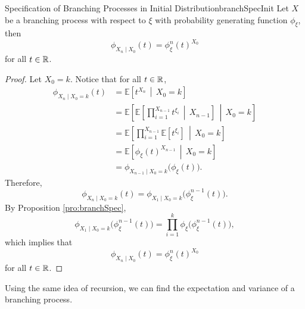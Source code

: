 \documentclass[math, code]{amznotes}
\theoremstyle{remark}
\begin{document}
\begin{corbox}{Specification of Branching Processes in Initial Distribution}{branchSpecInit}
    Let $X$ be a branching process with respect to $\xi$ with probability generating function $\phi_{\xi}$, then
    \begin{equation*}
        \phi_{X_n \mid X_0}\left(t\right) = \phi_{\xi}^{n}\left(t\right)^{X_0}
    \end{equation*}
    for all $t \in \mathbb{R}$.
    \tcblower
    \begin{proof}
        Let $X_0 = k$. Notice that for all $t \in \mathbb{R}$, 
        \begin{align*}
            \phi_{X_n \mid X_0 = k}\left(t\right) & = \mathbb{E}\left[t^{X_n} \,\middle\vert\, X_0 = k\right] \\ 
            & = \mathbb{E}\left[\mathbb{E}\left[\prod_{i = 1}^{X_{n - 1}}t^{\xi_i} \,\middle\vert\, X_{n - 1}\right] \,\middle\vert\, X_0 = k\right] \\
            & = \mathbb{E}\left[\prod_{i = 1}^{X_{n - 1}}\mathbb{E}\left[t^{\xi_i}\right]\,\middle\vert\, X_0 = k\right] \\
            & = \mathbb{E}\left[\phi_{\xi}\left(t\right)^{X_{n - 1}} \,\middle\vert\, X_0 = k\right] \\
            & = \phi_{X_{n - 1} \mid X_0 = k}\bigl(\phi_{\xi}\left(t\right)\bigr).
        \end{align*}
        Therefore, 
        \begin{equation*}
            \phi_{X_n \mid X_0 = k}\left(t\right) = \phi_{X_1 \mid X_0 = k}\bigl(\phi_{\xi}^{n - 1}\left(t\right)\bigr).
        \end{equation*}
        By Proposition \ref{pro:branchSpec}, 
        \begin{equation*}
            \phi_{X_1 \mid X_0 = k}\bigl(\phi_{\xi}^{n - 1}\left(t\right)\bigr) = \prod_{i = 1}^k\phi_{\xi}\bigl(\phi_{\xi}^{n - 1}\left(t\right)\bigr),
        \end{equation*}
        which implies that 
        \begin{equation*}
            \phi_{X_n \mid X_0}\left(t\right) = \phi_{\xi}^{n}\left(t\right)^{X_0}
        \end{equation*}
        for all $t \in \mathbb{R}$.
    \end{proof}
\end{corbox}
Using the same idea of recursion, we can find the expectation and variance of a branching process.
\end{document}
